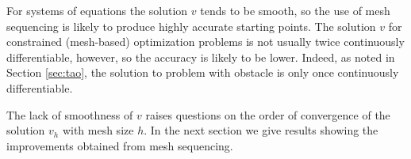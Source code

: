 For systems of equations the solution $v$ tends to be
smooth, so the use of mesh sequencing is likely to produce
highly accurate starting points.  The solution $v$ for
constrained (mesh-based) optimization problems is not usually twice
continuously differentiable, however, so the accuracy is likely to be
lower. Indeed, as noted in Section \ref{sec:tao}, the
solution to problem  with
obstacle  is only once continuously
differentiable.

The lack of smoothness of $v$ raises questions on the order
of convergence of the solution $ v_h $ with mesh size $h$.
In the next section we give results showing the
improvements obtained from mesh sequencing.

